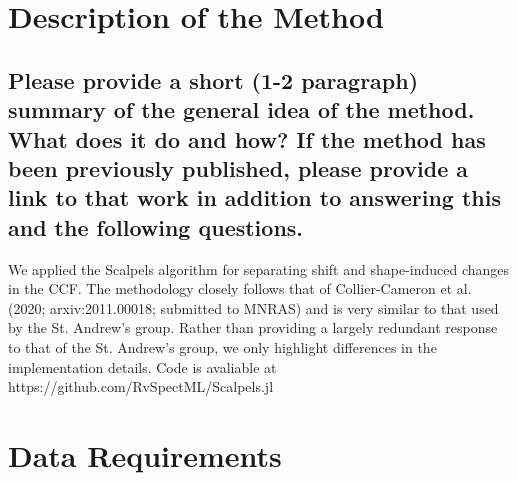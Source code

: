 \documentclass[12pt]{article}
\begin{document}
\section{Description of the Method}
\subsection{Please provide a short (1-2 paragraph) summary of the general idea of the method.  What does it do and how?  If the method has been previously published, please provide a link to that work in addition to answering this and the following questions.}

We applied the Scalpels algorithm for separating shift and shape-induced changes in the CCF.
The methodology closely follows that of Collier-Cameron et al. (2020; arxiv:2011.00018; submitted to MNRAS) and is very similar to that used by the St. Andrew's group.
Rather than providing a largely redundant response to that of the St. Andrew's group, we only highlight differences in the implementation details.
Code is avaliable at https://github.com/RvSpectML/Scalpels.jl 







\section{Data Requirements}
\end{document}

